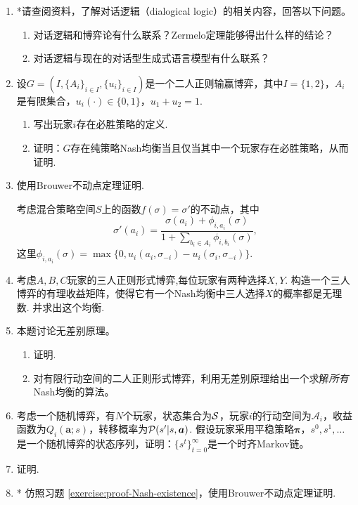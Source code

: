 \begin{enumerate}[wide, labelindent=0pt]
    \item *请查阅资料，了解对话逻辑（dialogical logic）的相关内容，回答以下问题。
    \begin{enumerate}
        \item 对话逻辑和博弈论有什么联系？Zermelo定理能够得出什么样的结论？
        \item 对话逻辑与现在的对话型生成式语言模型有什么联系？
    \end{enumerate}
    
    \item \label{exercise:zero-sum-pure-NE} 设$G=(I,\{A_i\}_{i\in I}, \{u_i\}_{i\in I})$是一个二人正则输赢博弈，其中$I=\{1,2\}$，$A_i$是有限集合，$u_i(\cdot)\in\{0,1\}$，$u_1+u_2=1$.
    \begin{enumerate}
        \item 写出玩家$i$存在必胜策略的定义.
        \item 证明：$G$存在纯策略Nash均衡当且仅当其中一个玩家存在必胜策略，从而证明.
    \end{enumerate}

    \item \label{exercise:proof-Nash-existence} 使用Brouwer不动点定理证明.
        \begin{hint}
        考虑混合策略空间$S$上的函数$f(\sigma) = \sigma'$的不动点，其中
        \[\sigma'(a_i) = \frac{\sigma(a_i) + \phi_{i,a_i}(\sigma)}{1+\sum_{b_i\in A_i}\phi_{i,b_i}(\sigma)},\]
        这里$\phi_{i,a_i}(\sigma)=\max\{0, u_i(a_i,\sigma_{-i})-u_i(\sigma_i,\sigma_{-i})\}$. 
        \end{hint}
    
    \item 考虑$A,B,C$玩家的三人正则形式博弈,每位玩家有两种选择$X,Y$. 构造一个三人博弈的有理收益矩阵，使得它有一个Nash均衡中三人选择$X$的概率都是无理数. 并求出这个均衡.

    \item \label{exercise:indifference-principle} 本题讨论无差别原理。
    \begin{enumerate}
        \item 证明.
        \item 对有限行动空间的二人正则形式博弈，利用无差别原理给出一个求解\textit{所有}Nash均衡的算法。
    \end{enumerate}

    \item \label{exercise:state-sequence-Markov} 考虑一个随机博弈，有$N$个玩家，状态集合为$\mathcal S$，玩家$i$的行动空间为$\mathcal A_i$，收益函数为$Q_i(\boldsymbol a;s)$，转移概率为$\mathcal P(s'|s,\boldsymbol a)$. 假设玩家采用平稳策略$\boldsymbol \pi$，$s^0,s^1,\dots$是一个随机博弈的状态序列，证明：$\{s^t\}_{t=0}^{\infty}$是一个时齐Markov链。
    
    \item \label{exercise:stochastic-game-bellman} 证明.
    
    \item *\label{exercise:proof-MPE-existence} 仿照习题 \ref{exercise:proof-Nash-existence}，使用Brouwer不动点定理证明.
\end{enumerate}
